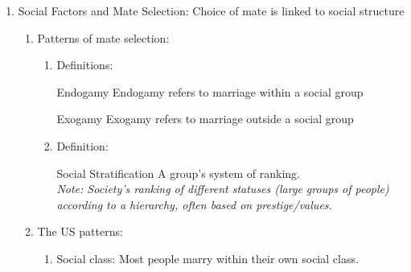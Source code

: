 \documentclass[12pt,a4paper]{article}
\begin{document}
\begin{enumerate}
\begin{enumerate}
\begin{enumerate}
			\begin{eg}{How do you know when you're on a date?}
				\begin{enumerate}
					\item What was the meaning of the consumption we now saw in dating? 
					\item What constitutes a gift and what constitutes payment? How do you know? 
				\end{enumerate}
			\end{eg}
			\item We have cultural templates that allow us to understand: 
			\begin{itemize}
				\item the intimacy level between two people
				\item the behavioral boundaries of a relationship
				\item the economic boundaries of a relationship between two people 
			\end{itemize}
			\item These boundaries are regulated by institutions, emotions, time, and the law. 
		\end{enumerate}
	\end{enumerate}
	\item Social Factors and Mate Selection: Choice of mate is linked to social structure
	\begin{enumerate}
		\item Patterns of mate selection: 
		\begin{enumerate}
			\item Definitions: 
			\begin{df}{Endogamy}
				Endogamy refers to marriage within a social group	
			\end{df}
			\begin{df}{Exogamy}
				Exogamy refers to marriage outside a social group	
			\end{df}
			\item Definition: 
			\begin{df}{Social Stratification}
				A group's system of ranking.\\ 
				\textit{Note: Society's ranking of different statuses (large groups of people) according to a hierarchy, often based on prestige/values.}
			\end{df}
		\end{enumerate} 
		\item The US patterns: 
		\begin{enumerate}
			\item Social class: Most people marry within their own social class.

\end{enumerate}
\end{enumerate}
\end{enumerate}
\end{document}
